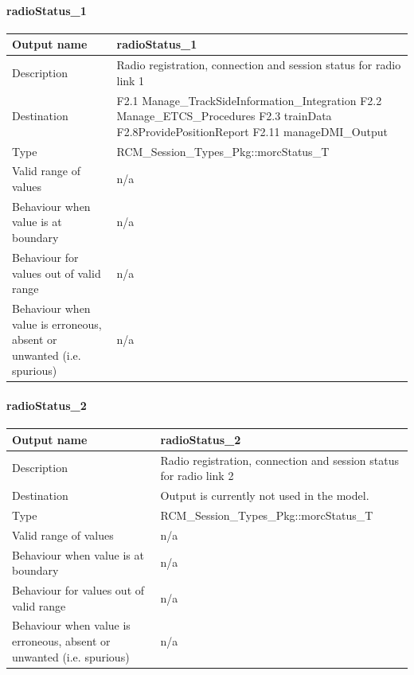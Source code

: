 \paragraph{radioStatus\_1}

\begin{longtable}{p{}p{}}
\toprule
Output name				& radioStatus\_1 \\
\midrule
Description				& Radio registration, connection and session status for radio link 1 \\
\midrule
Destination				& 
F2.1 Manage\_TrackSideInformation\_Integration\newline
F2.2 Manage\_ETCS\_Procedures\newline
F2.3 trainData\newline
F2.8ProvidePositionReport\newline
F2.11 manageDMI\_Output \\ 
\midrule
Type					& RCM\_Session\_Types\_Pkg::morcStatus\_T \\
\midrule
Valid range of values	& n/a \\
\midrule
Behaviour when value is at boundary	& n/a \\
\midrule
Behaviour for values out of valid range	& n/a \\
\midrule
Behaviour when value is erroneous, absent or unwanted (i.e. spurious) & n/a \\
\bottomrule
\end{longtable}

\paragraph{radioStatus\_2}

\begin{longtable}{p{}p{}}
	\toprule
	Output name				& radioStatus\_2 \\
	\midrule
	Description				& Radio registration, connection and session status for radio link 2 \\
	\midrule
	Destination				& Output is currently not used in the model. \\ 
	\midrule
	Type					& RCM\_Session\_Types\_Pkg::morcStatus\_T \\
	\midrule
	Valid range of values	& n/a \\
	\midrule
	Behaviour when value is at boundary	& n/a \\
	\midrule
	Behaviour for values out of valid range	& n/a \\
	\midrule
	Behaviour when value is erroneous, absent or unwanted (i.e. spurious) & n/a \\
	\bottomrule
\end{longtable}

